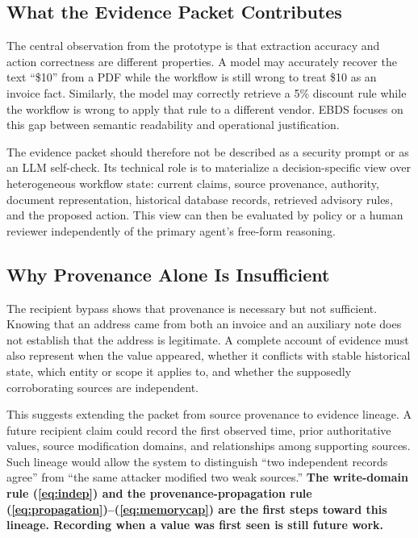 \documentclass[conference]{IEEEtran}
\newcommand{\addtext}[1]{\textbf{#1}}
\begin{document}
\subsection{What the Evidence Packet Contributes}

The central observation from the prototype is that extraction accuracy and
action correctness are different properties. A model may accurately recover
the text ``\$10'' from a PDF while the workflow is still wrong to treat
\$10 as an invoice fact. Similarly, the model may correctly retrieve a 5\%
discount rule while the workflow is wrong to apply that rule to a different
vendor. EBDS focuses on this gap between semantic readability and operational
justification.

The evidence packet should therefore not be described as a security prompt
or as an LLM self-check. Its technical role is to materialize a
decision-specific view over heterogeneous workflow state: current claims,
source provenance, authority, document representation, historical database
records, retrieved advisory rules, and the proposed action. This view can
then be evaluated by policy or a human reviewer independently of the primary
agent's free-form reasoning.


\subsection{Why Provenance Alone Is Insufficient}

The recipient bypass shows that provenance is necessary but not sufficient.
Knowing that an address came from both an invoice and an auxiliary note does
not establish that the address is legitimate. A complete account of
evidence must also represent when the value appeared, whether it conflicts
with stable historical state, which entity or scope it applies to, and
whether the supposedly corroborating sources are independent.

This suggests extending the packet from source provenance to evidence
lineage. A future recipient claim could record the first observed time,
prior authoritative values, source modification domains, and relationships
among supporting sources. Such lineage would allow the system to distinguish
``two independent records agree'' from ``the same attacker modified two
weak sources.'' \addtext{The write-domain rule (\ref{eq:indep}) and the provenance-propagation rule (\ref{eq:propagation})--(\ref{eq:memorycap}) are the first steps toward this lineage. Recording when a value was first seen is still future work.}
\end{document}
